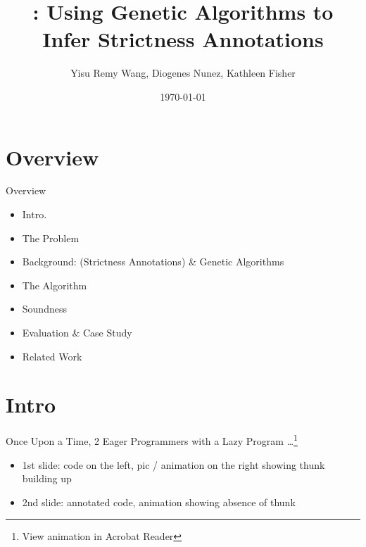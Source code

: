 \documentclass{beamer}
\title[Title]{\tname{} : Using Genetic Algorithms to Infer Strictness Annotations}
\author{Yisu Remy Wang, Diogenes Nunez, Kathleen Fisher}
\institute{Tufts University, Medford MA, USA}
\date{\today}
\begin{document}
\begin{frame}
  \titlepage
\end{frame}


\section{Overview}

\begin{frame}{Overview}

\begin{itemize}
  \item Intro. 
  \item The Problem
  \item Background: (Strictness Annotations) \& Genetic Algorithms
  \item The Algorithm
  \item Soundness
  \item Evaluation \& Case Study
  \item Related Work
  
\end{itemize}

%

\end{frame}

%

\section{Intro}
\begin{frame}{Once Upon a Time, 2 Eager Programmers with a Lazy Program \dots\footnote{View animation in Acrobat Reader}}
\begin{itemize}
\item 1st slide: code on the left, pic / animation on the right showing thunk building up
\item 2nd slide: annotated code, animation showing absence of thunk
\end{itemize}
\end{frame}
\end{document}
